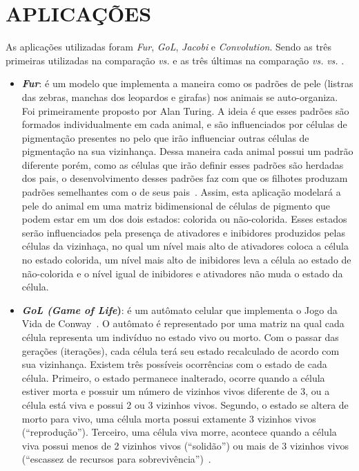 \section{APLICAÇÕES}
\label{sec:aplicacoes}

As aplicações utilizadas foram \textit{Fur}, \textit{GoL}, \textit{Jacobi} e \textit{Convolution}. Sendo as três primeiras utilizadas na comparação \async \textit{vs.} \ipc e as três últimas na comparação \async \textit{vs.} \gpu \textit{vs.} \cpu.

\begin{itemize}
  \item \textbf{\textit{Fur}}: é um modelo que implementa a maneira como os padrões de pele (listras das zebras, manchas dos leopardos e girafas) nos animais se auto-organiza. Foi primeiramente proposto por Alan Turing. A ideia é que esses padrões são formados individualmente em cada animal, e são influenciados por células de pigmentação presentes no pelo que irão influenciar outras células de pigmentação na sua vizinhança. Dessa maneira cada animal possui um padrão diferente porém, como as células que irão definir esses padrões são herdadas dos pais, o desenvolvimento desses padrões faz com que os filhotes produzam padrões semelhantes com o de seus pais~\cite{NetLogoFur}. Assim, esta aplicação modelará a pele do animal em uma matriz bidimensional de células de pigmento que podem estar em um dos dois estados: colorida ou não-colorida. Esses estados serão influenciados pela presença de ativadores e inibidores produzidos pelas células da vizinhaça, no qual um nível mais alto de ativadores coloca a célula no estado colorida, um nível mais alto de inibidores leva a célula ao estado de não-colorida e o nível igual de inibidores e ativadores não muda o estado da célula.

  \item \textbf{\textit{GoL (Game of Life})}: é um autômato celular que implementa o Jogo da Vida de Conway~\cite{gardner70}. O autômato é representado por uma matriz na qual cada célula representa um indivíduo no estado vivo ou morto. Com o passar das gerações (iterações), cada célula terá seu estado recalculado de acordo com sua vizinhança. Existem três possíveis ocorrências com o estado de cada célula. Primeiro, o estado permanece inalterado, ocorre quando a célula estiver morta e possuir um número de vizinhos vivos diferente de 3, ou a célula está viva e possui 2 ou 3 vizinhos vivos. Segundo, o estado se altera de morto para vivo, uma célula morta possui extamente 3 vizinhos vivos (``reprodução''). Terceiro, uma célula viva morre, acontece quando a célula viva possui menos de 2 vizinhos vivos (``solidão'') ou mais de 3 vizinhos vivos (``escassez de recursos para sobrevivência'')~\cite{CPE:CPE3479}. 
  

\end{itemize}
